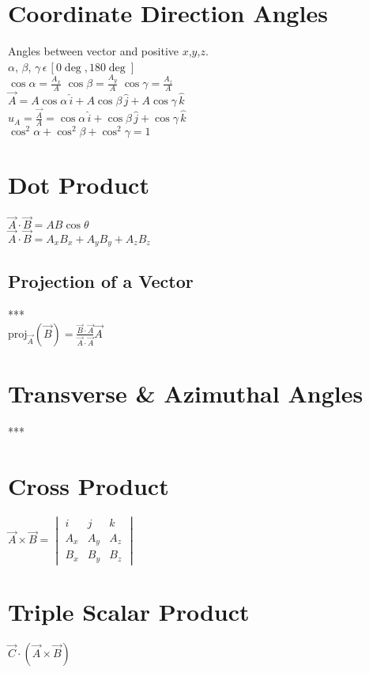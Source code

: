 \section*{Coordinate Direction Angles}

Angles between vector and positive $x$,$y$,$z$.\\
$\alpha$, $\beta$, $\gamma \,\epsilon \, [0\deg, 180\deg]$\\
$\cos\alpha = \frac{A_x}{A} \,\, \cos\beta = \frac{A_y}{A} \,\, \cos\gamma = \frac{A_z}{A}$\\
$\vec{A} = A\cos\alpha\, \hat{i} + A\cos\beta \, \hat{j} + A\cos\gamma \, \hat{k}$\\
$\hat{u}_A = \frac{\vec{A}}{A} = \cos\alpha \, \hat{i} + \cos\beta \, \hat{j} + \cos\gamma \, \hat{k}$\\
$\cos^2\alpha + \cos^2\beta + \cos^2\gamma = 1$\\

\section*{Dot Product}
$\vec{A} \cdot \vec{B} = AB\cos\theta$\\
$\vec{A}\cdot\vec{B} = A_xB_x + A_yB_y + A_zB_z$

\subsection*{Projection of a Vector}
***\\
$\text{proj}_{\vec{A}}(\vec{B}) = \frac{\vec{B}\cdot\vec{A}}{\vec{A}\cdot\vec{A}}\vec{A}$

\section*{Transverse \& Azimuthal Angles}
***

\section*{Cross Product}
$\vec{A} \times \vec{B} = \begin{vmatrix}
    i & j & k\\
    A_x & A_y & A_z \\
    B_x & B_y & B_z
\end{vmatrix}$


\section*{Triple Scalar Product}

$\vec{C} \cdot (\vec{A} \times \vec{B})$